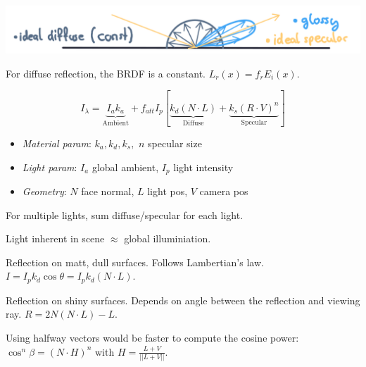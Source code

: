 \includegraphics*[width=\linewidth]{assets/reflections.png}

\begin{definition}
  For diffuse reflection, the BRDF is a constant.
  \(L_r(x) = f_r E_i(x)\).
\end{definition}

\begin{algorithm}
  \[I_\lambda = \underbrace{I_a k_a}_{\text{Ambient}} + f_{att}I_p[\underbrace{k_d(N \cdot L)}_{\text{Diffuse}} + \underbrace{k_s(R \cdot V)^n}_{\text{Specular}}]\]
  \begin{itemize}
    \item \textit{Material param}: \(k_a, k_d, k_s,\) \(n\) specular size
    \item \textit{Light param}: \(I_a\) global ambient, \(I_p\) light intensity
    \item \textit{Geometry}: \(N\) face normal, \(L\) light pos, \(V\) camera pos
  \end{itemize}
\end{algorithm}

\begin{theorem}
  For multiple lights, sum diffuse/specular for each light.
\end{theorem}

\begin{definition}[Ambient]
  Light inherent in scene \(\approx\) global illuminiation.
\end{definition}

\begin{definition}[Diffuse]
  Reflection on matt, dull surfaces. Follows Lambertian's law.
  \(I = I_pk_d\cos \theta = I_p k_d(N \cdot L)\).
\end{definition}

\begin{definition}[Specular]
  Reflection on shiny surfaces. Depends on angle between the reflection and viewing ray. \(R=2N(N \cdot L) - L\).
\end{definition}

\begin{theorem}
  Using halfway vectors would be faster to compute the cosine power: \(\cos^n \beta = (N \cdot H)^n\) with \(H = \frac{L + V}{||L + V||}\).
\end{theorem}

